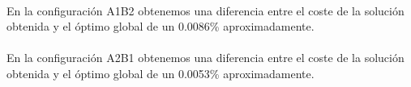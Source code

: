 	\paragraph{}En la configuración A1B2 obtenemos una diferencia entre el coste de la solución obtenida y el óptimo global de un 0.0086\% aproximadamente.
	
	\paragraph{}En la configuración A2B1 obtenemos una diferencia entre el coste de la solución obtenida y el óptimo global de un 0.0053\% aproximadamente.